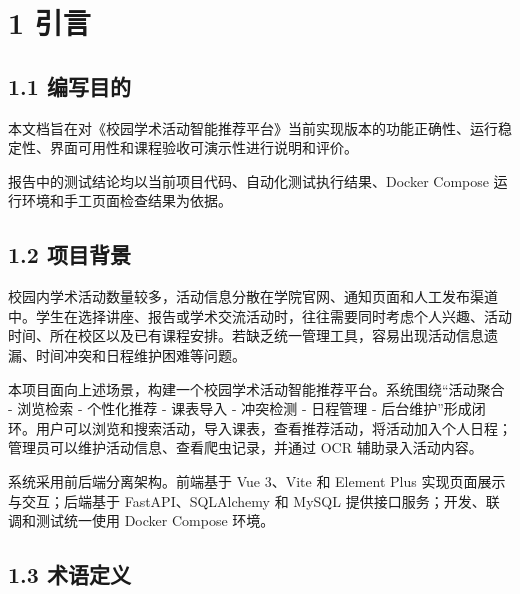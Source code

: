 \section{1 引言}\label{ux5f15ux8a00}

\subsection{1.1 编写目的}\label{ux7f16ux5199ux76eeux7684}

本文档旨在对《校园学术活动智能推荐平台》当前实现版本的功能正确性、运行稳定性、界面可用性和课程验收可演示性进行说明和评价。

报告中的测试结论均以当前项目代码、自动化测试执行结果、Docker Compose
运行环境和手工页面检查结果为依据。

\subsection{1.2 项目背景}\label{ux9879ux76eeux80ccux666f}

校园内学术活动数量较多，活动信息分散在学院官网、通知页面和人工发布渠道中。学生在选择讲座、报告或学术交流活动时，往往需要同时考虑个人兴趣、活动时间、所在校区以及已有课程安排。若缺乏统一管理工具，容易出现活动信息遗漏、时间冲突和日程维护困难等问题。

本项目面向上述场景，构建一个校园学术活动智能推荐平台。系统围绕``活动聚合
- 浏览检索 - 个性化推荐 - 课表导入 - 冲突检测 - 日程管理 -
后台维护''形成闭环。用户可以浏览和搜索活动，导入课表，查看推荐活动，将活动加入个人日程；管理员可以维护活动信息、查看爬虫记录，并通过
OCR 辅助录入活动内容。

系统采用前后端分离架构。前端基于 Vue 3、Vite 和 Element Plus
实现页面展示与交互；后端基于 FastAPI、SQLAlchemy 和 MySQL
提供接口服务；开发、联调和测试统一使用 Docker Compose 环境。

\subsection{1.3 术语定义}\label{ux672fux8bedux5b9aux4e49}

